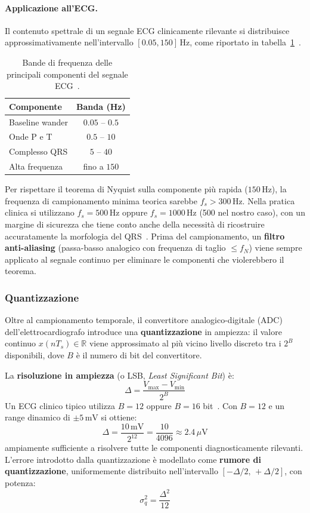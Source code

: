 \paragraph{Applicazione all'ECG.}
Il contenuto spettrale di un segnale ECG clinicamente rilevante si distribuisce approssimativamente nell'intervallo $[0.05, 150]\,\text{Hz}$, come riportato in tabella~\ref{tab:ecg_bands}~\cite{bailey1990aha, kligfield2007aha}.

\begin{table}[h!]
	\centering
	\begin{tabular}{lc}
		\toprule
		\textbf{Componente} & \textbf{Banda (Hz)} \\
		\midrule
		Baseline wander     & $0.05$ -- $0.5$  \\
		Onde P e T          & $0.5$ -- $10$    \\
		Complesso QRS       & $5$ -- $40$      \\
		Alta frequenza      & fino a $150$     \\
		\bottomrule
	\end{tabular}
	\caption{Bande di frequenza delle principali componenti del
		segnale ECG~\cite{bailey1990aha}.}
	\label{tab:ecg_bands}
\end{table}

Per rispettare il teorema di Nyquist sulla componente più rapida ($150\,\text{Hz}$), la frequenza di campionamento minima teorica sarebbe $f_s > 300\,\text{Hz}$. Nella pratica clinica si utilizzano $f_s = 500\,\text{Hz}$ oppure $f_s = 1000\,\text{Hz}$ (500 nel nostro caso), con un margine di sicurezza che tiene conto anche della necessità di ricostruire accuratamente la morfologia del QRS~\cite{kligfield2007aha}. Prima del campionamento, un \textbf{filtro anti-aliasing} (passa-basso analogico con frequenza di taglio $\leq f_N$) viene sempre applicato al segnale continuo per eliminare le componenti che violerebbero il teorema.

\subsubsection{Quantizzazione}
Oltre al campionamento temporale, il convertitore analogico-digitale (ADC) dell'elettrocardiografo introduce una \textbf{quantizzazione} in ampiezza: il valore continuo $x(nT_s) \in \mathbb{R}$ viene approssimato al più vicino livello discreto tra i $2^B$ disponibili, dove $B$ è il numero di bit del convertitore.

La \textbf{risoluzione in ampiezza} (o LSB, \textit{Least Significant Bit}) è:
\[
\Delta = \frac{V_{\max} - V_{\min}}{2^B}
\]
Un ECG clinico tipico utilizza $B = 12$ oppure $B = 16$ bit~\cite{kligfield2007aha}. Con $B = 12$ e un range dinamico di $\pm 5\,\text{mV}$ si ottiene:
\[
\Delta = \frac{10\,\text{mV}}{2^{12}} = \frac{10}{4096}
\approx 2.4\,\mu\text{V}
\]
ampiamente sufficiente a risolvere tutte le componenti diagnosticamente rilevanti. L'errore introdotto dalla quantizzazione è modellato come \textbf{rumore di quantizzazione}, uniformemente distribuito nell'intervallo $[-\Delta/2,\, +\Delta/2]$, con potenza:
\[
\sigma_q^2 = \frac{\Delta^2}{12}
\]

